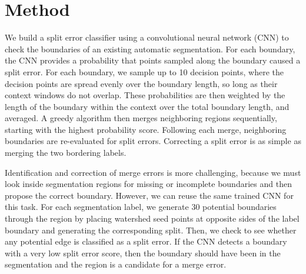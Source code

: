 \section{Method}
We build a split error classifier using a convolutional neural network (CNN) to check the boundaries of an existing automatic segmentation. For each boundary, the CNN provides a probability that points sampled along the boundary caused a split error. For each boundary, we sample up to 10 decision points, where the decision points are spread evenly over the boundary length, so long as their context windows do not overlap. These probabilities are then weighted by the length of the boundary within the context over the total boundary length, and averaged. A greedy algorithm then merges neighboring regions sequentially, starting with the highest probability score. Following each merge, neighboring boundaries are re-evaluated for split errors. Correcting a split error is as simple as merging the two bordering labels.

Identification and correction of merge errors is more challenging, because we must look inside segmentation regions for missing or incomplete boundaries and then propose the correct boundary. However, we can reuse the same trained CNN for this task. For each segmentation label, we generate 30 potential boundaries through the region by placing watershed seed points at opposite sides of the label boundary and generating the corresponding split. Then, we check to see whether any potential edge is classified as a split error. If the CNN detects a boundary with a very low split error score, then the boundary should have been in the segmentation and the region is a candidate for a merge error.








